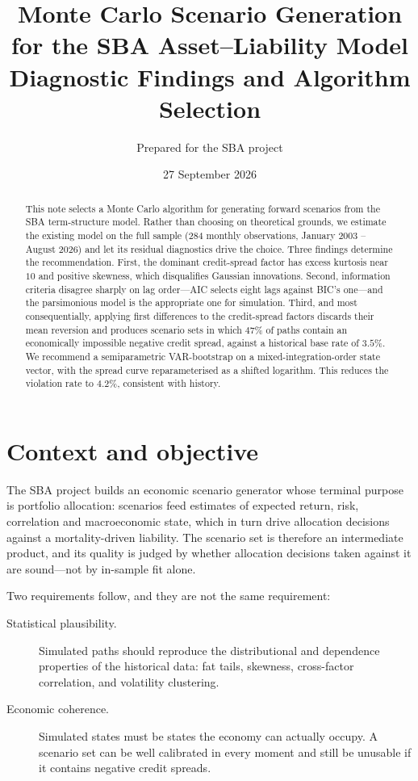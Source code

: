 \documentclass[11pt,a4paper]{article}
\title{Monte Carlo Scenario Generation for the SBA Asset--Liability Model\\
       \large Diagnostic Findings and Algorithm Selection}
\author{Prepared for the SBA project}
\date{27 September 2026}
\begin{document}
\maketitle

\begin{abstract}
This note selects a Monte Carlo algorithm for generating forward scenarios from
the SBA term-structure model. Rather than choosing on theoretical grounds, we
estimate the existing model on the full sample (284 monthly observations,
January 2003 -- August 2026) and let its residual diagnostics drive the choice.
Three findings determine the recommendation. First, the dominant credit-spread
factor has excess kurtosis near $10$ and positive skewness, which disqualifies
Gaussian innovations. Second, information criteria disagree sharply on lag
order---AIC selects eight lags against BIC's one---and the parsimonious model is
the appropriate one for simulation. Third, and most consequentially, applying
first differences to the credit-spread factors discards their mean reversion and
produces scenario sets in which $47\%$ of paths contain an economically
impossible negative credit spread, against a historical base rate of $3.5\%$. We
recommend a semiparametric VAR-bootstrap on a mixed-integration-order state
vector, with the spread curve reparameterised as a shifted logarithm. This
reduces the violation rate to $4.2\%$, consistent with history.
\end{abstract}

\section{Context and objective}

The SBA project builds an economic scenario generator whose terminal purpose is
portfolio allocation: scenarios feed estimates of expected return, risk,
correlation and macroeconomic state, which in turn drive allocation decisions
against a mortality-driven liability. The scenario set is therefore an
intermediate product, and its quality is judged by whether allocation decisions
taken against it are sound---not by in-sample fit alone.

Two requirements follow, and they are not the same requirement:

\begin{description}
  \item[Statistical plausibility.] Simulated paths should reproduce the
    distributional and dependence properties of the historical data: fat tails,
    skewness, cross-factor correlation, and volatility clustering.
  \item[Economic coherence.] Simulated states must be states the economy can
    actually occupy. A scenario set can be well calibrated in every moment and
    still be unusable if it contains negative credit spreads.
\end{description}
\end{document}
